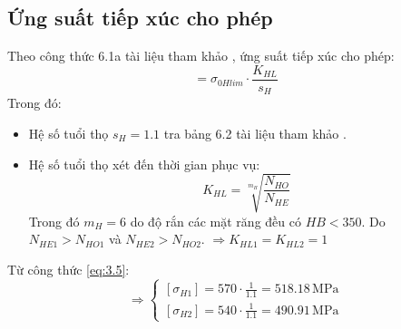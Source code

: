         \subsection{Ứng suất tiếp xúc cho phép}
            \hspace*{0.6cm}Theo công thức 6.1a tài liệu tham khảo \cite{tltk1}, ứng suất tiếp xúc cho phép:
            \begin{equation}
                [\sigma_{H}] = \sigma_{0Hlim} \cdot \frac{K_{HL}}{s_{H}}
                \label{eq:3.5}
            \end{equation} 
            \hspace*{0.6cm}Trong đó:
            \begin{itemize}
                \item Hệ số tuổi thọ $s_H = 1.1$ tra bảng 6.2 tài liệu tham khảo \cite{gtctm}.
                \item Hệ số tuổi thọ xét đến thời gian phục vụ:
                    \begin{equation}
                        K_{HL} = \sqrt[m_H]{\frac{N_{HO}}{N_{HE}}}
                        \label{eq:3.6}
                    \end{equation}
                    Trong đó $m_H = 6$ do độ rắn các mặt răng đều có $HB < 350$. Do $N_{HE1} > N_{HO1}$ và $N_{HE2} > N_{HO2}$. $\Rightarrow K_{HL1} = K_{HL2} = 1$\\
                    
            \end{itemize}
            \hspace*{0.6cm}Từ công thức \ref{eq:3.5}:
            \[
            \Rightarrow
            \begin{cases}
                [\sigma_{H1}] = 570 \cdot \frac{1}{1.1} = 518.18 \, \mathrm{MPa} \\
                [\sigma_{H2}] = 540 \cdot \frac{1}{1.1} = 490.91 \, \mathrm{MPa}
            \end{cases}
            \] 
